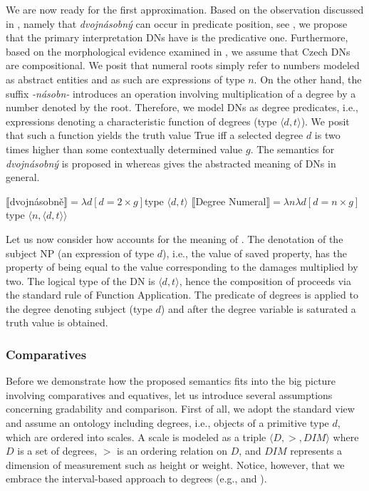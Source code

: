 \documentclass[output=paper,
modfonts,
hidelinks,
newtxmath
]{langscibook}
\begin{document}
We are now ready for the first approximation. Based on the observation discussed in , namely that \textit{dvojnásobný} can occur in predicate position, see , we propose that the primary interpretation DNs have is the predicative one. Furthermore, based on the morphological evidence examined in , we assume that Czech DNs are compositional. We posit that numeral roots simply refer to numbers modeled as abstract entities and as such are expressions of type $n$. On the other hand, the suffix \textit{-násobn-} introduces an operation involving multiplication of a degree by a number denoted by the root. Therefore, we model DNs as degree predicates, i.e., expressions denoting a characteristic function of degrees (type $\langle d,t\rangle$). We posit that such a function yields the truth value True iff a selected degree $d$ is two times higher than some contextually determined value $g$. The semantics for \textit{dvojnásobný} is proposed in  whereas  gives the abstracted meaning of DNs in general.

\ea\label{degree-num-semantics}
\ea $\llbracket$dvojnásobně$\rrbracket = \lambda d[d = 2 \times g]$\hfill{type $\langle d,t\rangle$}\label{degree-num-semantics-dvojnasobne}
\ex $\llbracket$Degree Numeral$\rrbracket = \lambda n\lambda d[d = n \times g]$\hfill{type $\langle n,\langle d,t\rangle\rangle$}\label{degree-num-semantics-abstract}
\z \z

\noindent Let us now consider how  accounts for the meaning of . The denotation of the subject NP (an expression of type $d$), i.e., the value of saved property, has the property of being equal to the value corresponding to the damages multiplied by two. The logical type of the DN is $\langle d,t\rangle$, hence the composition of  proceeds via the standard rule of Function Application. The predicate of degrees is applied to the degree denoting subject (type $d$) and after the degree variable is saturated a truth value is obtained.

\subsubsection{Comparatives}\label{comparatives}

Before we demonstrate how the proposed semantics fits into the big picture involving comparatives and equatives, let us introduce several assumptions concerning gradability and comparison. First of all, we adopt the standard view and assume an ontology including degrees, i.e., objects of a primitive type $d$, which are ordered into scales. A scale is modeled as a triple $\langle D, >, DIM\rangle$ where $D$ is a set of degrees, $>$ is an ordering relation on $D$, and $DIM$ represents a dimension of measurement such as height or weight. Notice, however, that we embrace the interval-based approach to degrees (e.g., \citealt{kennedy2001polar} and \citealt{schwarzschild_wilkinson2002quantifiers}).
\end{document}
